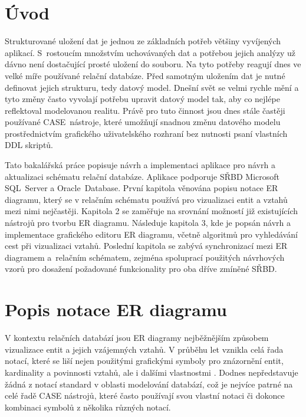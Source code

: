 \documentclass[czech,bachelor,public,dept460,male,oneside]{diploma}
\begin{document}
\MakeTitlePages

\lstlistoflistings

\section{Úvod}
Strukturované uložení dat je jednou ze základních potřeb většiny vyvíjených aplikací. S~rostoucím množstvím uchovávaných dat a potřebou jejich analýzy už dávno není dostačující prosté uložení do souboru. Na tyto potřeby reagují dnes ve velké míře používané relační databáze. Před samotným uložením dat je nutné definovat jejich strukturu, tedy datový model. Dnešní svět se velmi rychle mění a tyto změny často vyvolají potřebu upravit datový model tak, aby co nejlépe reflektoval modelovanou realitu. Právě pro tuto činnost jsou dnes stále častěji používané CASE~nástroje, které umožňují snadnou změnu datového modelu prostřednictvím grafického uživatelského rozhraní bez nutnosti psaní vlastních DDL skriptů.

Tato bakalářská práce popisuje návrh a implementaci aplikace pro návrh a aktualizaci schématu relační databáze. Aplikace podporuje SŘBD Microsoft SQL~Server a Oracle~Database. První kapitola věnována popisu notace ER diagramu, který se v relačním schématu používá pro vizualizaci entit a vztahů mezi nimi nejčastěji. Kapitola 2 se zaměřuje na srovnání možností již existujících nástrojů pro tvorbu ER diagramu. Následuje kapitola 3, kde je popsán návrh a implementace grafického editoru ER diagramu, včetně algoritmů pro vyhledávání cest při vizualizaci vztahů. Poslední kapitola se zabývá synchronizací mezi ER diagramem a~relačním schématem, zejména spoluprací použitých návrhových vzorů pro dosažení požadované funkcionality pro oba dříve zmíněné SŘBD.

\section{Popis notace ER diagramu}
V kontextu relačních databází jsou ER diagramy nejběžnějším způsobem vizualizace entit a jejich vzájemných vztahů. V průběhu let vznikla celá řada notací, které se liší nejen použitými grafickými symboly pro znázornění entit, kardinality a povinnosti vztahů, ale i dalšími vlastnostmi \cite{compErNotations}. Dodnes nepředstavuje žádná z notací standard v oblasti modelování databází, což je nejvíce patrné na celé řadě CASE nástrojů, které často používají svou vlastní notaci či dokonce kombinaci symbolů z několika různých notací.
\end{document}
